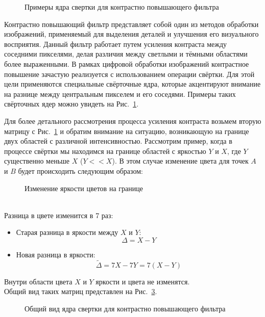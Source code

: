 \begin{figure}[h]
    \centering
    
    \caption{Примеры ядра свертки для контрастно повышающего фильтра}
    \label{fig:sharpen_filter}
\end{figure}

Контрастно повышающий фильтр представляет собой один из методов обработки изображений, применяемый для выделения деталей и улучшения его визуального восприятия. Данный фильтр работает путем усиления контраста между соседними пикселями, делая различия между светлыми и тёмными областями более выраженными. В рамках цифровой обработки изображений контрастное повышение зачастую реализуется с использованием операции свёртки. Для этой цели применяются специальные свёрточные ядра, которые акцентируют внимание на разнице между центральным пикселем и его соседями. Примеры таких свёрточных ядер можно увидеть на Рис.~\ref{fig:sharpen_filter}.

Для более детального рассмотрения процесса усиления контраста возьмем вторую матрицу с Рис.~\ref{fig:sharpen_filter} и обратим внимание на ситуацию, возникающую на границе двух областей с различной интенсивностью. Рассмотрим пример, когда в процессе свёртки мы находимся на границе областей с яркостью $Y$ и $X$, где $Y$ существенно меньше $X$ ($Y<<X$). В этом случае изменение цвета для точек $A$ и $B$ будет происходить следующим образом:
\\
\begin{figure}[h]
    \centering
    
    \caption{Изменение яркости цветов на границе}
    \label{fig:sharpen_on_border}
\end{figure}
\\

Разница в цвете изменится в 7 раз:
\begin{itemize}
    \item Старая разница в яркости между $X$ и $Y$:
          \[\Delta = X - Y\]
    \item Новая разница в яркости:
          \[\tilde \Delta= 7X - 7Y = 7(X - Y)\]
\end{itemize}

Внутри области цвета $X$ и $Y$ яркости и цвета не изменятся.\\

Общий вид таких матриц представлен на Рис.~\ref{fig:sharpen_general_view}.
\\
\begin{figure}[h]
    \centering
    
    \caption{Общий вид ядра свертки для контрастно повышающего фильтра}
    \label{fig:sharpen_general_view}
\end{figure}
\\

